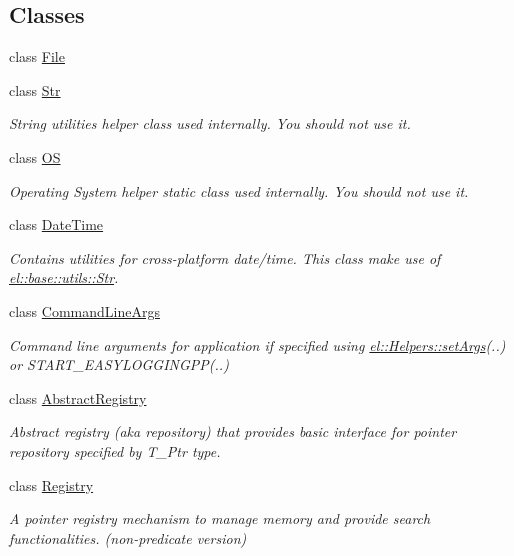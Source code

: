 \subsection*{Classes}
\begin{DoxyCompactItemize}
\item 
class \hyperlink{classel_1_1base_1_1utils_1_1File}{File}
\item 
class \hyperlink{classel_1_1base_1_1utils_1_1Str}{Str}
\begin{DoxyCompactList}\small\item\em String utilities helper class used internally. You should not use it. \end{DoxyCompactList}\item 
class \hyperlink{classel_1_1base_1_1utils_1_1OS}{O\-S}
\begin{DoxyCompactList}\small\item\em Operating System helper static class used internally. You should not use it. \end{DoxyCompactList}\item 
class \hyperlink{classel_1_1base_1_1utils_1_1DateTime}{Date\-Time}
\begin{DoxyCompactList}\small\item\em Contains utilities for cross-\/platform date/time. This class make use of \hyperlink{classel_1_1base_1_1utils_1_1Str}{el\-::base\-::utils\-::\-Str}. \end{DoxyCompactList}\item 
class \hyperlink{classel_1_1base_1_1utils_1_1CommandLineArgs}{Command\-Line\-Args}
\begin{DoxyCompactList}\small\item\em Command line arguments for application if specified using \hyperlink{classel_1_1Helpers_a68748f618a0c2840b96dc12532b09bf0}{el\-::\-Helpers\-::set\-Args}(..) or S\-T\-A\-R\-T\-\_\-\-E\-A\-S\-Y\-L\-O\-G\-G\-I\-N\-G\-P\-P(..) \end{DoxyCompactList}\item 
class \hyperlink{classel_1_1base_1_1utils_1_1AbstractRegistry}{Abstract\-Registry}
\begin{DoxyCompactList}\small\item\em Abstract registry (aka repository) that provides basic interface for pointer repository specified by T\-\_\-\-Ptr type. \end{DoxyCompactList}\item 
class \hyperlink{classel_1_1base_1_1utils_1_1Registry}{Registry}
\begin{DoxyCompactList}\small\item\em A pointer registry mechanism to manage memory and provide search functionalities. (non-\/predicate version) \end{DoxyCompactList}\item 

\end{DoxyCompactItemize}
